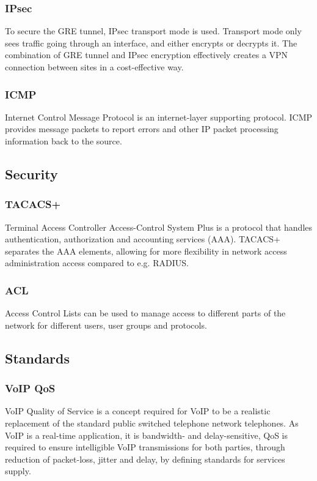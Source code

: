 \subsubsection{IPsec}
\vspace{-0.6em}
To secure the GRE tunnel, IPsec transport mode is used.
Transport mode only sees traffic going through an interface, and either encrypts or decrypts it. 
The combination of GRE tunnel and IPsec encryption effectively creates a VPN connection between sites in a cost-effective way.

\subsubsection{ICMP}
\vspace{-0.6em}
Internet Control Message Protocol is an internet-layer supporting protocol.
ICMP provides message packets to report errors and other IP packet processing information back to the source. \cite{ICMP}

\subsection{Security}

\subsubsection{TACACS+}
\vspace{-0.6em}
Terminal Access Controller Access-Control System Plus is a protocol that handles authentication, authorization and accounting services (AAA).
TACACS+ separates the AAA elements, allowing for more flexibility in network access administration access compared to e.g. RADIUS.
\cite{TACACS+}

\subsubsection{ACL}
\vspace{-0.6em}
Access Control Lists can be used to manage access to different parts of the network for different users, user groups and protocols.

\subsection{Standards}

\subsubsection{VoIP QoS}
\vspace{-0.6em}
VoIP Quality of Service is a concept required for VoIP to be a realistic replacement of the standard public switched telephone network telephones.
As VoIP is a real-time application, it is bandwidth- and delay-sensitive, QoS is required to ensure intelligible VoIP transmissions for both parties, through reduction of packet-loss, jitter and delay, by defining standards for services supply. \cite{VoIP-QoS}
